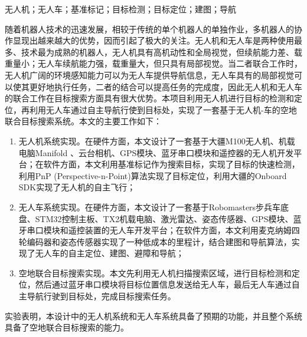 
\begin{cnabstract}{无人机；无人车；基准标记；目标检测；目标定位；建图；导航}
	
随着机器人技术的迅速发展，相较于传统的单个机器人的单独作业，多机器人的协作显现出越来越大的优势，因而引起了极大的关注。无人机和无人车是两种使用最多、技术最为成熟的机器人，无人机具有高机动性和全局视觉，但续航能力差、载重量小；无人车续航能力强，载重量大，但只具有局部视觉。当二者联合工作时，无人机广阔的环境感知能力可以为无人车提供导航信息，无人车具有的局部视觉可以使其更好地执行任务，二者的结合可以提高任务的完成度，因此无人机和无人车的联合工作在目标搜索方面具有很大优势。本项目利用无人机进行目标的检测和定位，再利用无人车通过自主导航行使到目标处，实现了一套基于无人机-车的空地联合目标搜索系统。本文的主要工作如下：

\begin{enumerate}[label=(\arabic*)] 
	\item 无人机系统实现。在硬件方面，本文设计了一套基于大疆M100无人机、机载电脑Manifold 、云台相机、GPS模块、蓝牙串口模块和遥控器的无人机开发平台；在软件方面，本文利用基准标记作为搜索目标，实现了目标的快速检测，利用PnP (Perspective-n-Point)算法实现了目标定位，利用大疆的Onboard SDK实现了无人机的自主飞行；
	\item 无人车系统实现。在硬件方面，本文设计了一套基于Robomasters步兵车底盘、STM32控制主板、TX2机载电脑、激光雷达、姿态传感器、GPS模块、蓝牙串口模块和遥控装置的无人车开发平台；在软件方面，本文利用麦克纳姆四轮编码器和姿态传感器实现了一种低成本的里程计，结合建图和导航算法，实现了无人车的自主定位、建图、避障和导航；
	\item 空地联合目标搜索实现。本文先利用无人机扫描搜索区域，进行目标检测和定位，然后通过蓝牙串口模块将目标位置信息发送给无人车，最后无人车通过自主导航行驶到目标处，完成目标搜索任务。
\end{enumerate}

实验表明，本设计中的无人机系统和无人车系统具备了预期的功能，并且整个系统具备了空地联合目标搜索的能力。

\end{cnabstract}


